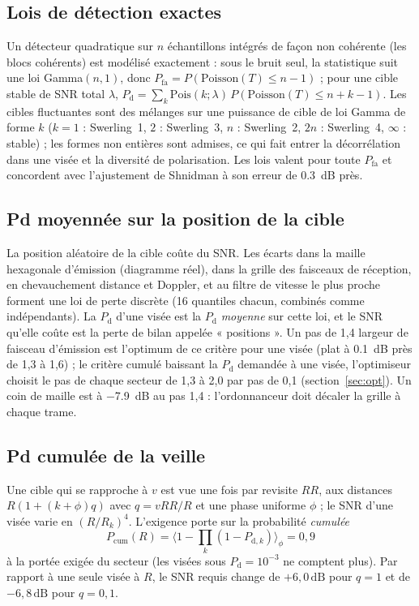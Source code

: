 \documentclass[11pt,a4paper]{article}
\newcommand{\dB}{\,\mathrm{dB}}
\newcommand{\Pd}{P_{\mathrm d}}
\newcommand{\Pfa}{P_{\mathrm{fa}}}
\begin{document}
\subsection{Lois de détection exactes}
Un détecteur quadratique sur $n$ échantillons intégrés de façon non cohérente (les blocs cohérents) est modélisé
exactement : sous le bruit seul, la statistique suit une loi Gamma$(n,1)$, donc $\Pfa = P(\mathrm{Poisson}(T) \le n-1)$ ;
pour une cible stable de SNR total $\lambda$, $\Pd = \sum_k \mathrm{Pois}(k;\lambda)\,P(\mathrm{Poisson}(T)\le n+k-1)$.
Les cibles fluctuantes sont des mélanges sur une puissance de cible de loi Gamma de forme $k$ ($k=1$ : Swerling~1,
$2$ : Swerling~3, $n$ : Swerling~2, $2n$ : Swerling~4, $\infty$ : stable) ; les formes non entières sont admises, ce qui
fait entrer la décorrélation dans une visée et la diversité de polarisation. Les lois valent pour toute $\Pfa$ et
concordent avec l'ajustement de Shnidman à son erreur de \SI{0.3}{dB} près.

\subsection{Pd moyennée sur la position de la cible}
La position aléatoire de la cible coûte du SNR. Les écarts dans la maille hexagonale d'émission (diagramme réel), dans
la grille des faisceaux de réception, en chevauchement distance et Doppler, et au filtre de vitesse le plus proche
forment une loi de perte discrète (16 quantiles chacun, combinés comme indépendants). La $\Pd$ d'une visée est la $\Pd$
\emph{moyenne} sur cette loi, et le SNR qu'elle coûte est la perte de bilan appelée « positions ». Un pas de 1,4
largeur de faisceau d'émission est l'optimum de ce critère pour une visée (plat à \SI{0.1}{dB} près de 1,3 à 1,6) ; le
critère cumulé baissant la $\Pd$ demandée à une visée, l'optimiseur choisit le pas de chaque secteur de 1,3 à 2,0 par
pas de 0,1 (section~\ref{sec:opt}). Un coin de maille est à \SI{-7.9}{dB} au pas 1,4 : l'ordonnanceur doit décaler la
grille à chaque trame.

\subsection{Pd cumulée de la veille}
Une cible qui se rapproche à $v$ est vue une fois par revisite $RR$, aux distances $R(1+(k+\phi)q)$ avec $q = vRR/R$ et
une phase uniforme $\phi$ ; le SNR d'une visée varie en $(R/R_k)^4$. L'exigence porte sur la probabilité
\emph{cumulée}
\[
  P_{\mathrm{cum}}(R) = \bigl\langle 1 - \textstyle\prod_k (1 - P_{\mathrm{d},k})\bigr\rangle_\phi = 0,9
\]
à la portée exigée du secteur (les visées sous $\Pd = 10^{-3}$ ne comptent plus). Par rapport à une seule visée à $R$,
le SNR requis change de $+6,0\dB$ pour $q=1$ et de $-6,8\dB$ pour $q=0,1$.
\end{document}
